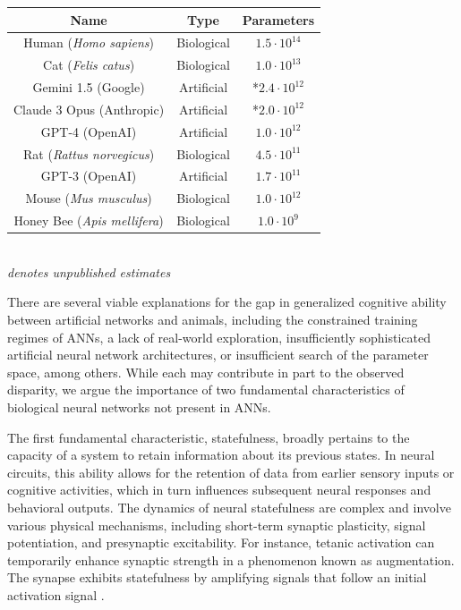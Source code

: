 \documentclass{article}
\begin{document}
\begin{multicols}{2}
\begin{center}
{	\begin{tabular}{c | c | c}
	 \textbf{Name} & \textbf{Type} & \textbf{Parameters} \\
	 \hline
	 Human (\textit{Homo sapiens}) & Biological & $1.5 \cdot 10^{14}$ \cite{azevedo2009} \\
  Cat (\textit{Felis catus}) & Biological & $1.0 \cdot 10^{13}$ \cite{ananth2009} \\
	 Gemini 1.5 (Google) & Artificial & *$2.4 \cdot 10^{12}$\\
    Claude 3 Opus (Anthropic) & Artificial & *$2.0 \cdot 10^{12}$ \cite{claude} \\
	 GPT-4 (OpenAI) & Artificial & $1.0 \cdot 10^{12}$ \cite{maad2023} \\
     Rat (\textit{Rattus norvegicus}) & Biological & $4.5 \cdot 10^{11}$ \cite{houzel2005}\\
     GPT-3 (OpenAI) & Artificial & $1.7 \cdot 10^{11}$ \cite{maad2023} \\
     Mouse (\textit{Mus musculus}) & Biological & $1.0 \cdot 10^{12}$ \cite{houzel2006} \\
	 Honey Bee (\textit{Apis mellifera}) & Biological & $1.0 \cdot 10^{9}$ \cite{menzel2001} \\
	 
\end{tabular}}
\\
\vspace{5pt}
\textit{ \footnotesize * denotes unpublished estimates}
	\end{center}	
	There are several viable explanations for the gap in generalized cognitive ability between artificial networks and animals, including the constrained training regimes of ANNs, a lack of real-world exploration, insufficiently sophisticated artificial neural network architectures, or insufficient search of the parameter space, among others. While each may contribute in part to the observed disparity, we argue the importance of two fundamental  characteristics of biological neural networks not present in ANNs.
	
	The first fundamental characteristic, statefulness, broadly pertains to the capacity of a system to retain information about its previous states. In neural circuits, this ability allows for the retention of data from earlier sensory inputs or cognitive activities, which in turn influences subsequent neural responses and behavioral outputs. The dynamics of neural statefulness are complex and involve various physical mechanisms, including short-term synaptic plasticity, signal potentiation, and presynaptic excitability. For instance, tetanic activation can temporarily enhance synaptic strength in a phenomenon known as augmentation. The synapse exhibits statefulness by amplifying signals that follow an initial activation signal \cite{reghr2012}.


\end{multicols}
\end{document}
